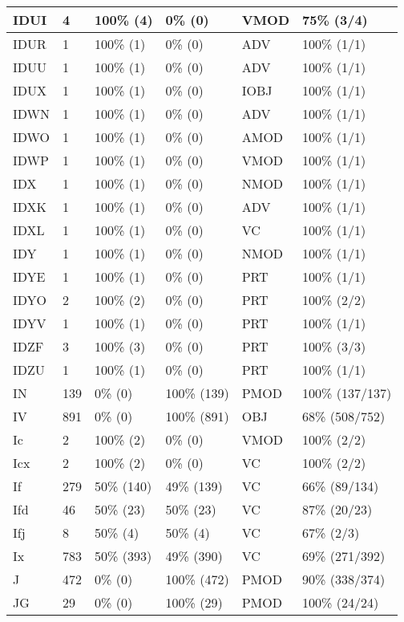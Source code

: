 \begin{figure*}
\begin{tabular}{|l|l|l|l||l|l|}
\hline
 IDUI & 4 & 100\% (4) & 0\% (0) & VMOD & 75\% (3/4) \\ 
\hline
 IDUR & 1 & 100\% (1) & 0\% (0) & ADV & 100\% (1/1) \\ 
\hline
 IDUU & 1 & 100\% (1) & 0\% (0) & ADV & 100\% (1/1) \\ 
\hline
 IDUX & 1 & 100\% (1) & 0\% (0) & IOBJ & 100\% (1/1) \\ 
\hline
 IDWN & 1 & 100\% (1) & 0\% (0) & ADV & 100\% (1/1) \\ 
\hline
 IDWO & 1 & 100\% (1) & 0\% (0) & AMOD & 100\% (1/1) \\ 
\hline
 IDWP & 1 & 100\% (1) & 0\% (0) & VMOD & 100\% (1/1) \\ 
\hline
 IDX & 1 & 100\% (1) & 0\% (0) & NMOD & 100\% (1/1) \\ 
\hline
 IDXK & 1 & 100\% (1) & 0\% (0) & ADV & 100\% (1/1) \\ 
\hline
 IDXL & 1 & 100\% (1) & 0\% (0) & VC & 100\% (1/1) \\ 
\hline
 IDY & 1 & 100\% (1) & 0\% (0) & NMOD & 100\% (1/1) \\ 
\hline
 IDYE & 1 & 100\% (1) & 0\% (0) & PRT & 100\% (1/1) \\ 
\hline
 IDYO & 2 & 100\% (2) & 0\% (0) & PRT & 100\% (2/2) \\ 
\hline
 IDYV & 1 & 100\% (1) & 0\% (0) & PRT & 100\% (1/1) \\ 
\hline
 IDZF & 3 & 100\% (3) & 0\% (0) & PRT & 100\% (3/3) \\ 
\hline
 IDZU & 1 & 100\% (1) & 0\% (0) & PRT & 100\% (1/1) \\ 
\hline
 IN & 139 & 0\% (0) & 100\% (139) & PMOD & 100\% (137/137) \\ 
\hline
 IV & 891 & 0\% (0) & 100\% (891) & OBJ & 68\% (508/752) \\ 
\hline
 Ic & 2 & 100\% (2) & 0\% (0) & VMOD & 100\% (2/2) \\ 
\hline
 Icx & 2 & 100\% (2) & 0\% (0) & VC & 100\% (2/2) \\ 
\hline
 If & 279 & 50\% (140) & 49\% (139) & VC & 66\% (89/134) \\ 
\hline
 Ifd & 46 & 50\% (23) & 50\% (23) & VC & 87\% (20/23) \\ 
\hline
 Ifj & 8 & 50\% (4) & 50\% (4) & VC & 67\% (2/3) \\ 
\hline
 Ix & 783 & 50\% (393) & 49\% (390) & VC & 69\% (271/392) \\ 
\hline
 J & 472 & 0\% (0) & 100\% (472) & PMOD & 90\% (338/374) \\ 
\hline
 JG & 29 & 0\% (0) & 100\% (29) & PMOD & 100\% (24/24) \\ 
\hline
\end{tabular}
\end{figure*}
